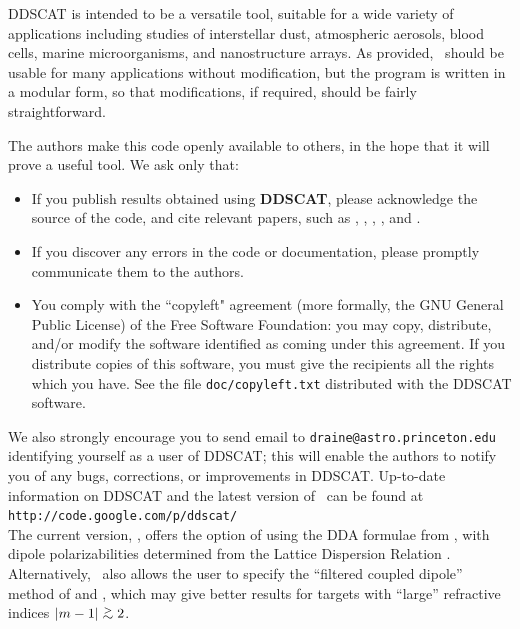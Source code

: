 DDSCAT is intended to be a versatile tool, suitable for a wide variety
of applications including studies of interstellar dust, atmospheric aerosols,
blood cells, marine microorganisms, 
and nanostructure arrays.
As provided, \ddscatv\ should be usable 
for many applications without
modification, but the program is written in a modular form, so that
modifications, if required, should be fairly straightforward.

The authors make this code openly available to others, in the hope that it
will prove a useful tool.  We ask only that:
\begin{itemize}
\item If you publish results obtained using {{\bf DDSCAT}}, please 
	acknowledge the source of the code, and cite relevant papers,
	such as \citet{Draine_1988}, 
        \citet{Goodman+Draine+Flatau_1990},
        \citet{Draine+Flatau_1994}, 
        \citet{Draine+Flatau_2008a},
	and \citet{Flatau+Draine_2012}. 

\item If you discover any errors in the code or documentation, 
	please promptly communicate them to the authors.

\item You comply with the ``copyleft" agreement (more formally, the 
	GNU General Public License) of the Free Software Foundation: you may 
	copy, distribute, and/or modify the software identified as coming 
	under this agreement. 
	If you distribute copies of this software, you must give the 
	recipients all the rights which you have. 
	See the file {\tt doc/copyleft.txt} 
        distributed with the DDSCAT software.
\end{itemize}
We also strongly encourage you to send email to
{\tt draine@astro.princeton.edu} identifying  
yourself as a user of DDSCAT;  this will enable the authors to notify you of
any bugs, corrections, or improvements in DDSCAT.
Up-to-date information on DDSCAT 
and the latest version of \ddscatv\ can be found at\\
 {\tt http://code.google.com/p/ddscat/}\\

The current version, \ddscatv,
offers the option of using the DDA formulae from \citet{Draine_1988}, with
dipole polarizabilities determined from the Lattice Dispersion
Relation \citep{Draine+Goodman_1993,Gutkowicz-Krusin+Draine_2004}.
Alternatively, \ddscatv\ also allows the user to specify the
``filtered coupled dipole'' method of 
\citet{Piller+Martin_1998} and \citet{Gay-Balmaz+Martin_2002}, which may
give better results for targets with ``large'' refractive indices
$|m-1|\gtsim 2$.
 
